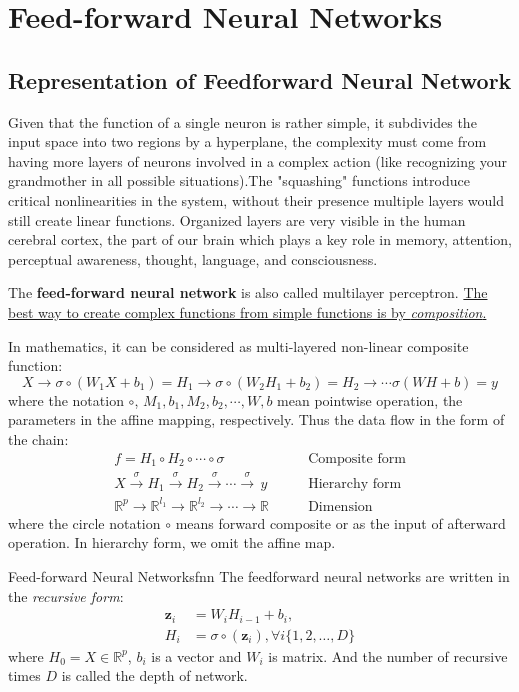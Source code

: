 \documentclass[titlestyle=hang,11pt]{elegantbook}
\begin{document}
\section{Feed-forward Neural Networks}

\subsection{Representation of Feedforward Neural Network}

Given that the function of a single neuron is rather simple, it subdivides the input space into two regions by a hyperplane, the complexity must come from having more layers of neurons involved in a complex action (like recognizing your grandmother in all possible situations).The "squashing" functions introduce critical nonlinearities in the system, without their presence multiple layers would still create linear functions.
Organized layers are very visible in the human cerebral cortex, the part of our brain which plays a key role in memory, attention, perceptual awareness, thought, language, and consciousness.%

The \textbf{feed-forward neural network} is also called multilayer perceptron. 
\href{http://math.mit.edu/~gs/learningfromdata/SIAM03.pdf}{The best way to create complex functions from simple functions is by \emph{composition}.}

In mathematics, it  can be considered as multi-layered non-linear composite function:
$$X\to \sigma\circ (W_1X+b_1)=H_1\to \sigma\circ(W_2 H_1+b_2)=H_2 \to\cdots \sigma(WH+b)=y $$
where the notation $\circ$, $M_1,b_1,M_2,b_2,\cdots, W,b$ mean pointwise operation, the parameters in the affine mapping, respectively. 
Thus the data flow in the form of the chain:
\begin{align}
f = H_1 \circ {H_2}\circ \cdots \circ{\sigma} \qquad   &\text{Composite form}           \\
X\stackrel{\sigma}\to H_1 \stackrel{\sigma}\to H_2 \stackrel{\sigma} \to \cdots\stackrel{\sigma}\to\,y \qquad &\text{Hierarchy form}         \\
\mathbb{R}^p\to \mathbb{R}^{l_1}\to \mathbb{R}^{l_2}\to \cdots\to \mathbb{R}  \qquad&  \text{Dimension}
\end{align}
where the circle notation $\circ$ means forward composite or as the input of afterward operation.
In hierarchy form, we omit the affine map.

\begin{definition}{Feed-forward Neural Networks}{fnn}
	The feedforward neural networks are written in the \emph{recursive form}:
	\begin{align}
		\mathbf{z}_{i} &= W_{i}H_{i-1}+b_i, \\
                H_{i}  &=\sigma\circ (\mathbf{z}_{i}),
		\forall i\{1,2,\dots,D\} 
	\end{align}
where $H_{0}=X\in\mathbb{R}^p$, $b_i$ is a vector and $W_{i}$ is matrix. And the number of recursive times $D$ is called the depth of network.
\end{definition}
\end{document}
